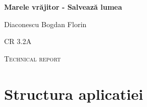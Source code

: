 \documentclass{article}
\begin{document}
\begin{titlepage}
	\centering
	\vspace{4cm}
	{\huge\bfseries\LARGE Marele vrăjitor - Salvează lumea \par}
	\vspace{2cm}
	{\Large Diaconescu Bogdan Florin\par}
	\vspace{1cm}
	{\Large CR 3.2A\par}
	\vspace{1cm}
	\vfill

\end{titlepage}


\begin{centering}
\vspace{1cm}
{\scshape\Large Technical report \par}
\end{centering}
\vspace{1.5cm}

\section{Structura aplicatiei}
\end{document}
